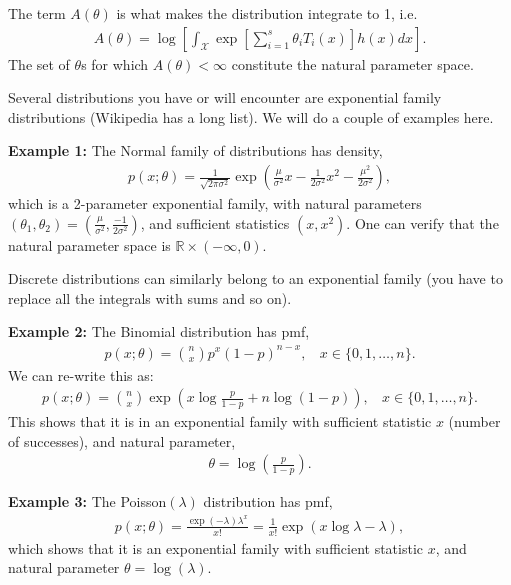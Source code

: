 \documentclass[twoside,12pt]{article}
\begin{document}
The term $A(\theta)$ is what makes the distribution integrate to 1, i.e. 
\begin{align*}
A(\theta) = \log \left[ \int_{\mathcal{X}} \exp \left[ \sum_{i=1}^s \theta_i T_i(x)\right] h(x) dx \right]. 
\end{align*}
The set of $\theta$s for which  $A(\theta) < \infty$ constitute the natural parameter space.


Several distributions you have or will encounter are exponential family distributions (Wikipedia has a long list). We will do a couple of examples here.

{\bf Example 1: } The Normal family of distributions has density,
\begin{align*}
p(x;\theta ) = \frac{1}{\sqrt{2\pi\sigma^2}} \exp \left( \frac{\mu}{\sigma^2} x - \frac{1}{2 \sigma^2} x^2 - \frac{\mu^2}{2 \sigma^2} \right), 
\end{align*}
which is a 2-parameter exponential family, with natural parameters $(\theta_1,\theta_2) = \left( \frac{\mu}{\sigma^2},   \frac{-1}{2 \sigma^2} \right)$, and sufficient statistics $(x,x^2)$. One can verify that the natural parameter space is $\mathbb{R} \times (-\infty, 0).$

Discrete distributions can similarly belong to an exponential family (you have to replace all the integrals with sums and so on).

{\bf Example 2: } The Binomial distribution has pmf,
\begin{align*}
p(x;\theta) = {n \choose x} p^{x} (1-p)^{n-x},~~~~ x \in \{0,1,\ldots,n\}.
\end{align*}
We can re-write this as:
\begin{align*}
p(x;\theta) = {n \choose x} \exp \left(x \log \frac{p}{1-p} + n \log(1-p)\right)  ,~~~~ x \in \{0,1,\ldots,n\}.
\end{align*}
This shows that it is in an exponential family with sufficient statistic $x$ (number of successes), and natural parameter,
\begin{align*}
\theta = \log \left(\frac{p}{1-p}\right).
\end{align*}

{\bf Example 3: } The Poisson$(\lambda)$ distribution has pmf,
\begin{align*}
p(x; \theta) = \frac{ \exp(- \lambda) \lambda^x}{x!} = \frac{1}{x!} \exp (x \log \lambda - \lambda),
\end{align*}
which shows that it is an exponential family with sufficient statistic $x$, and natural parameter $\theta = \log (\lambda)$.
\end{document}
